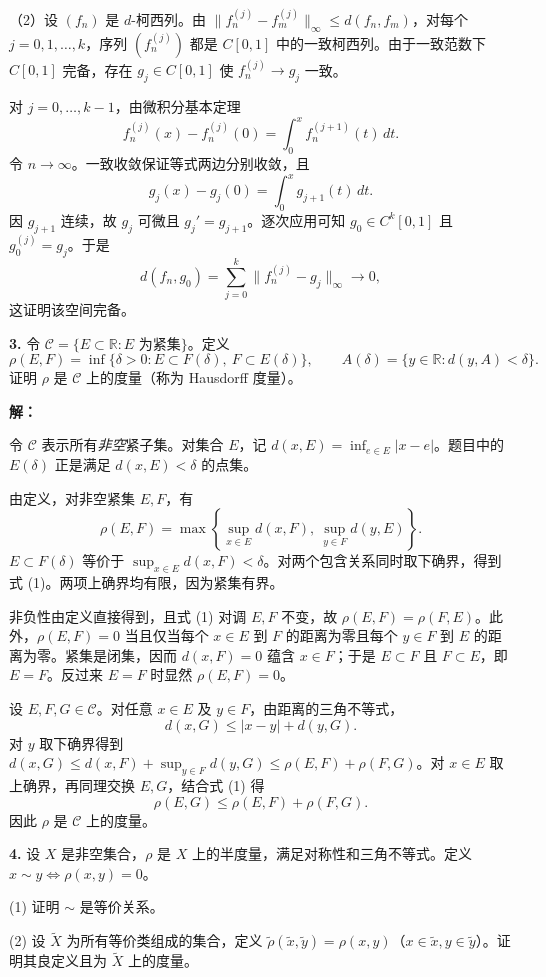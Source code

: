 \documentclass{article}
\begin{document}
（2）设 $(f_n)$ 是 $d$-柯西列。由
\(\|f_n^{(j)}-f_m^{(j)}\|_\infty\leq d(f_n,f_m)\)，对每个 $j=0,1,\ldots,k$，序列 $(f_n^{(j)})$ 都是 $C[0,1]$ 中的一致柯西列。由于一致范数下 $C[0,1]$ 完备，存在 $g_j\in C[0,1]$ 使 $f_n^{(j)}\to g_j$ 一致。

对 $j=0,\ldots,k-1$，由微积分基本定理
\[
f_n^{(j)}(x)-f_n^{(j)}(0)=\int_0^x f_n^{(j+1)}(t)\,dt.
\]
令 $n\to\infty$。一致收敛保证等式两边分别收敛，且
\[
g_j(x)-g_j(0)=\int_0^x g_{j+1}(t)\,dt.
\]
因 $g_{j+1}$ 连续，故 $g_j$ 可微且 $g_j'=g_{j+1}$。逐次应用可知 $g_0\in C^k[0,1]$ 且 $g_0^{(j)}=g_j$。于是
\[
d(f_n,g_0)=\sum_{j=0}^k\|f_n^{(j)}-g_j\|_\infty\longrightarrow0,
\]
这证明该空间完备。

\textbf{3.} 令 $\mathcal C=\{E\subset\mathbb R:E\text{ 为紧集}\}$。定义
\[
\rho(E,F)=\inf\{\delta>0:E\subset F(\delta),\ F\subset E(\delta)\},
\qquad A(\delta)=\{y\in\mathbb R:d(y,A)<\delta\}.
\]
证明 $\rho$ 是 $\mathcal C$ 上的度量（称为 Hausdorff 度量）。

\textbf{解：}

令 $\mathcal C$ 表示所有\emph{非空}紧子集。对集合 $E$，记
\(d(x,E)=\inf_{e\in E}|x-e|\)。题目中的 $E(\delta)$ 正是满足 $d(x,E)<\delta$ 的点集。

由定义，对非空紧集 $E,F$，有
\[
\rho(E,F)=\max\left\{\sup_{x\in E}d(x,F),\ \sup_{y\in F}d(y,E)\right\}.
\tag{1}
\]
$E\subset F(\delta)$ 等价于 $\sup_{x\in E}d(x,F)<\delta$。对两个包含关系同时取下确界，得到式 (1)。两项上确界均有限，因为紧集有界。

非负性由定义直接得到，且式 (1) 对调 $E,F$ 不变，故 $\rho(E,F)=\rho(F,E)$。此外，$\rho(E,F)=0$ 当且仅当每个 $x\in E$ 到 $F$ 的距离为零且每个 $y\in F$ 到 $E$ 的距离为零。紧集是闭集，因而 $d(x,F)=0$ 蕴含 $x\in F$；于是 $E\subset F$ 且 $F\subset E$，即 $E=F$。反过来 $E=F$ 时显然 $\rho(E,F)=0$。

设 $E,F,G\in\mathcal C$。对任意 $x\in E$ 及 $y\in F$，由距离的三角不等式，
\[
d(x,G)\leq |x-y|+d(y,G).
\]
对 $y$ 取下确界得到
\(d(x,G)\leq d(x,F)+\sup_{y\in F}d(y,G)\leq\rho(E,F)+\rho(F,G)\)。对 $x\in E$ 取上确界，再同理交换 $E,G$，结合式 (1) 得
\[
\rho(E,G)\leq\rho(E,F)+\rho(F,G).
\]
因此 $\rho$ 是 $\mathcal C$ 上的度量。

\textbf{4.} 设 $X$ 是非空集合，$\rho$ 是 $X$ 上的半度量，满足对称性和三角不等式。定义 $x\sim y\iff\rho(x,y)=0$。

(1) 证明 $\sim$ 是等价关系。

(2) 设 $\widetilde X$ 为所有等价类组成的集合，定义 $\widetilde\rho(\widetilde x,\widetilde y)=\rho(x,y)$（$x\in\widetilde x,y\in\widetilde y$）。证明其良定义且为 $\widetilde X$ 上的度量。
\end{document}
